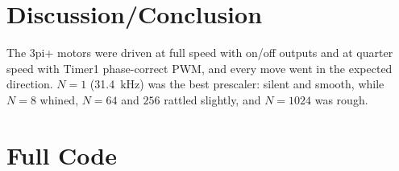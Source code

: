\documentclass[11pt]{article}
\begin{document}
\section{Discussion/Conclusion}
The 3pi+ motors were driven at full speed with on/off outputs and at quarter speed with Timer1 phase-correct PWM, and every move went in the expected direction. $N = 1$ (31.4~kHz) was the best prescaler: silent and smooth, while $N = 8$ whined, $N = 64$ and $256$ rattled slightly, and $N = 1024$ was rough.

\pagebreak

\appendix
\section{Full Code}
\label{app:code}
















\end{document}
